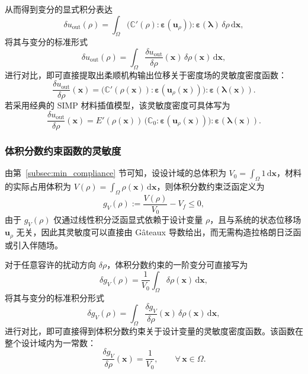 从而得到变分的显式积分表达
\[
\delta u_{\mathrm{out}}(\rho) = \int_{\Omega} \big(\mathbb{C}'(\rho):\boldsymbol{\varepsilon}(\boldsymbol{u}_\rho)\big) :\boldsymbol{\varepsilon}(\boldsymbol{\lambda})\, \delta\rho\,\mathrm{d}\boldsymbol{x},
\]
将其与变分的标准形式
\[
\delta u_{\mathrm{out}}(\rho) = \int_{\Omega}\frac{\delta u_{\mathrm{out}}}{\delta\rho}(\boldsymbol{x})\, \delta\rho(\boldsymbol{x})\,\mathrm{d}\boldsymbol{x},
\]
进行对比，即可直接提取出柔顺机构输出位移关于密度场的灵敏度密度函数：
\begin{equation} \label{eq:ch2_mechanism_sensitivity_general}
	\frac{\delta u_{\mathrm{out}}}{\delta\rho}(\boldsymbol{x}) = \big(\mathbb{C}'(\rho(\boldsymbol{x})) : \boldsymbol{\varepsilon}(\boldsymbol{u}_\rho(\boldsymbol{x}))\big) : \boldsymbol{\varepsilon}(\boldsymbol{\lambda}(\boldsymbol{x})).
\end{equation}
若采用经典的 SIMP 材料插值模型，该灵敏度密度可具体写为
\[
\frac{\delta u_{\mathrm{out}}}{\delta\rho}(\boldsymbol{x}) = E'(\rho(\boldsymbol{x}))\, \big(\mathbb{C}_0:\boldsymbol{\varepsilon}(\boldsymbol{u}_\rho(\boldsymbol{x}))\big) : \boldsymbol{\varepsilon}(\boldsymbol{\lambda}(\boldsymbol{x})).
\]


\subsubsection*{体积分数约束函数的灵敏度}

由第~\ref{subsec:min_compliance} 节可知，设设计域的总体积为 $V_0 = \int_{\Omega} 1\,\mathrm{d}\boldsymbol{x}$，材料的实际占用体积为 $V(\rho) = \int_{\Omega}\rho(\boldsymbol{x})\,\mathrm{d}\boldsymbol{x}$，则体积分数约束泛函定义为	
\[
g_V(\rho) := \frac{V(\rho)}{V_0} - V_f \le 0,
\]
由于 $g_V(\rho)$ 仅通过线性积分泛函显式依赖于设计变量 $\rho$，且与系统的状态位移场 $\boldsymbol{u}_\rho$ 无关，因此其灵敏度可以直接由 Gâteaux 导数给出，而无需构造拉格朗日泛函或引入伴随场。

对于任意容许的扰动方向 $\delta\rho$，体积分数约束的一阶变分可直接写为
\[
\delta g_V(\rho) = \frac{1}{V_0}\int_{\Omega}\delta\rho(\boldsymbol{x})\,\mathrm{d}\boldsymbol{x},
\]
将其与变分的标准积分形式
\[
\delta g_V(\rho) = \int_{\Omega}\frac{\delta g_V}{\delta\rho}(\boldsymbol{x})\,\delta\rho(\boldsymbol{x})\,\mathrm{d}\boldsymbol{x},
\]
进行对比，即可直接得到体积分数约束关于设计变量的灵敏度密度函数。该函数在整个设计域内为一常数：
\begin{equation} \label{eq:ch2_volume_sensitivity}
	\frac{\delta g_V}{\delta\rho}(\boldsymbol{x}) = \frac{1}{V_0}, \qquad \forall\,\boldsymbol{x}\in\Omega.
\end{equation}


